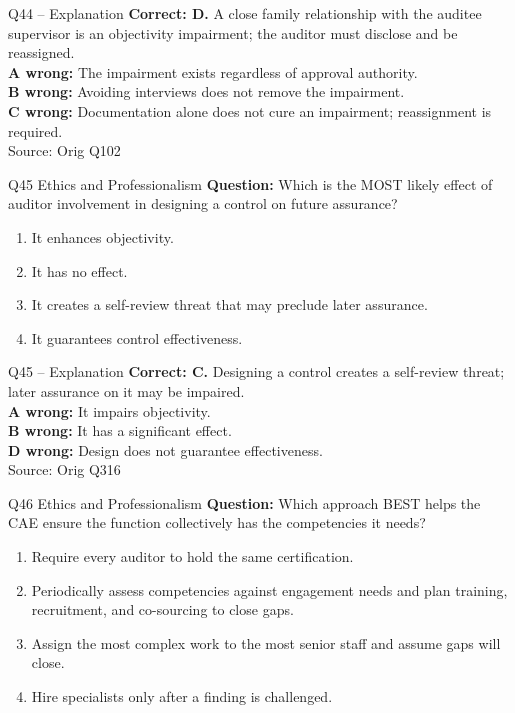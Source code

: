 \documentclass[aspectratio=169,10pt]{beamer}
\begin{document}
\begin{frame}[t]{Q44 -- Explanation}
	\footnotesize
	\textbf{Correct: D.} A close family relationship with the auditee supervisor is an objectivity impairment; the auditor must disclose and be reassigned. \\[5pt]
\textbf{A wrong:} The impairment exists regardless of approval authority. \\[3pt]
\textbf{B wrong:} Avoiding interviews does not remove the impairment. \\[3pt]
\textbf{C wrong:} Documentation alone does not cure an impairment; reassignment is required. \\[3pt]
	\vfill {\tiny Source: Orig Q102}
\end{frame}

\begin{frame}[t]{Q45 \hfill {\scriptsize Ethics and Professionalism}}
	\small
	\textbf{Question:} Which is the MOST likely effect of auditor involvement in designing a control on future assurance?
	\begin{enumerate}[label=\Alph*.,itemsep=1pt,topsep=3pt]
			\item It enhances objectivity.
			\item It has no effect.
			\item It creates a self-review threat that may preclude later assurance.
			\item It guarantees control effectiveness.
	\end{enumerate}
\end{frame}

\begin{frame}[t]{Q45 -- Explanation}
	\footnotesize
	\textbf{Correct: C.} Designing a control creates a self-review threat; later assurance on it may be impaired. \\[5pt]
\textbf{A wrong:} It impairs objectivity. \\[3pt]
\textbf{B wrong:} It has a significant effect. \\[3pt]
\textbf{D wrong:} Design does not guarantee effectiveness. \\[3pt]
	\vfill {\tiny Source: Orig Q316}
\end{frame}

\begin{frame}[t]{Q46 \hfill {\scriptsize Ethics and Professionalism}}
	\small
	\textbf{Question:} Which approach BEST helps the CAE ensure the function collectively has the competencies it needs?
	\begin{enumerate}[label=\Alph*.,itemsep=1pt,topsep=3pt]
			\item Require every auditor to hold the same certification.
			\item Periodically assess competencies against engagement needs and plan training, recruitment, and co-sourcing to close gaps.
			\item Assign the most complex work to the most senior staff and assume gaps will close.
			\item Hire specialists only after a finding is challenged.
	\end{enumerate}
\end{frame}
\end{document}
